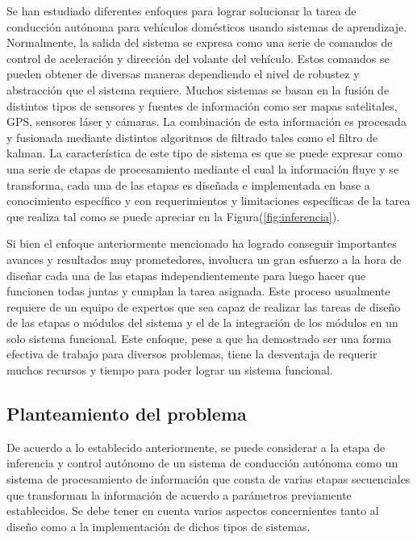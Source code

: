Se han estudiado diferentes enfoques para lograr solucionar la tarea de 
conducción autónoma para vehículos domésticos usando sistemas de aprendizaje. Normalmente, la salida del 
sistema se expresa como una serie de comandos de control de aceleración y dirección 
del volante del vehículo. Estos comandos se pueden obtener de diversas maneras dependiendo 
el nivel de robustez y abstracción que el sistema requiere. Muchos sistemas 
se basan en la fusión de distintos tipos de sensores y fuentes de información como ser 
mapas satelitales, GPS, sensores láser y cámaras. La combinación de esta información 
es procesada y fusionada mediante distintos algoritmos de filtrado tales como el filtro de kalman. 
La característica de este tipo de sistema es que se puede expresar como una serie de etapas 
de procesamiento mediante el cual la información fluye y se transforma, cada una de las etapas es 
diseñada e implementada en base a conocimiento específico y con requerimientos y limitaciones específicas 
de la tarea que realiza tal como se puede apreciar en la Figura(\ref{fig:inferencia}).

Si bien el enfoque anteriormente mencionado ha logrado conseguir importantes avances y resultados 
muy prometedores, involucra un gran esfuerzo a la hora de diseñar cada una de las etapas independientemente 
para luego hacer que funcionen todas juntas y cumplan la tarea asignada. Este proceso usualmente requiere 
de un equipo de expertos que sea capaz de realizar las tareas de diseño de las etapas o módulos del sistema 
y el de la integración de los módulos en un solo sistema funcional. Este enfoque, pese a que ha demostrado ser 
una forma efectiva de trabajo para diversos problemas, tiene la desventaja de requerir muchos 
recursos y tiempo para poder lograr un sistema funcional. 

%
\subsection{Planteamiento del problema}

% 
De acuerdo a lo establecido anteriormente, se puede considerar a la etapa de inferencia y control autónomo de 
un sistema de conducción autónoma como un sistema de procesamiento de información que consta de varias etapas 
secuenciales que transforman la información de acuerdo a parámetros previamente establecidos. Se debe tener en 
cuenta varios aspectos concernientes tanto al diseño como a la implementación de dichos tipos de sistemas. 

